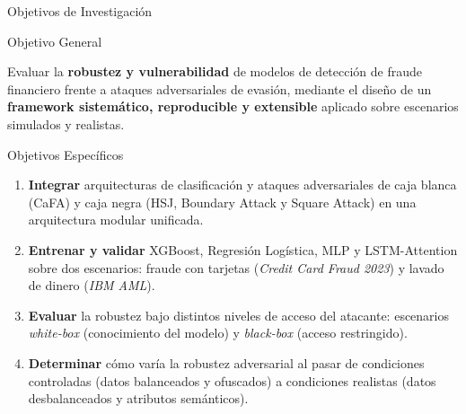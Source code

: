 \documentclass[aspectratio=169, 8pt]{beamer}
\begin{document}
\begin{frame}{Objetivos de Investigación}

\begin{block}{Objetivo General}

Evaluar la \textbf{robustez y vulnerabilidad}
de modelos de detección de fraude financiero
frente a ataques adversariales de evasión,
mediante el diseño de un \textbf{framework
sistemático, reproducible y extensible}
aplicado sobre escenarios simulados y realistas.

\end{block}

\vspace{0.2cm}

\begin{exampleblock}{Objetivos Específicos}

\begin{enumerate}

\item \textbf{Integrar}
arquitecturas de clasificación y ataques
adversariales de caja blanca (CaFA) y caja negra
(HSJ, Boundary Attack y Square Attack)
en una arquitectura modular unificada.

\vspace{0.1cm}

\item \textbf{Entrenar y validar}
XGBoost, Regresión Logística, MLP y
LSTM-Attention sobre dos escenarios:
fraude con tarjetas (\textit{Credit Card Fraud 2023})
y lavado de dinero (\textit{IBM AML}).

\vspace{0.1cm}

\item \textbf{Evaluar}
la robustez bajo distintos niveles de acceso
del atacante: escenarios \textit{white-box}
(conocimiento del modelo) y \textit{black-box}
(acceso restringido).

\vspace{0.1cm}

\item \textbf{Determinar}
cómo varía la robustez adversarial al pasar
de condiciones controladas
(datos balanceados y ofuscados)
a condiciones realistas
(datos desbalanceados y atributos semánticos).

\end{enumerate}

\end{exampleblock}

\end{frame}
\end{document}
